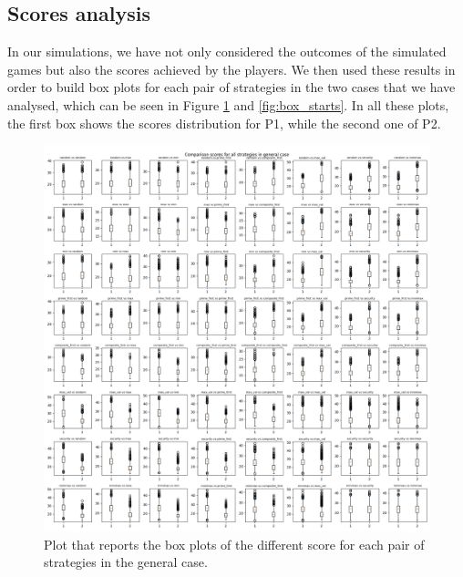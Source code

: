 \subsection{Scores analysis} \label{subsection:scores}

In our simulations, we have not only considered the outcomes of the simulated games but also the scores achieved by the players.
We then used these results in order to build box plots for each pair of strategies in the two cases that we have analysed, which can be seen in Figure \ref{fig:box_general} and \ref{fig:box_starts}. In all these plots, the first box shows the scores distribution for P1, while the second one of P2.

\begin{figure}
	\centering
	\includegraphics[width=1\linewidth]{img/scores_general.png}
	\caption{Plot that reports the box plots of the different score for each pair of strategies in the general case.}
	\label{fig:box_general}
\end{figure}

